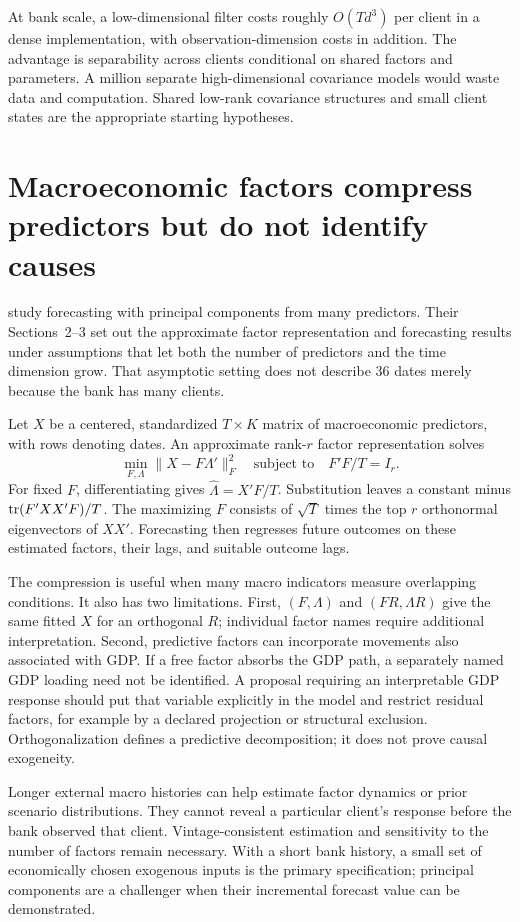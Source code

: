 At bank scale, a low-dimensional filter costs roughly $O(Td^3)$ per client in a dense implementation, with observation-dimension costs in addition. The advantage is separability across clients conditional on shared factors and parameters. A million separate high-dimensional covariance models would waste data and computation. Shared low-rank covariance structures and small client states are the appropriate starting hypotheses.

\section{Macroeconomic factors compress predictors but do not identify causes}
\citet{stock2002} study forecasting with principal components from many predictors. Their Sections~2--3 set out the approximate factor representation and forecasting results under assumptions that let both the number of predictors and the time dimension grow. That asymptotic setting does not describe 36 dates merely because the bank has many clients.

Let $X$ be a centered, standardized $T\times K$ matrix of macroeconomic predictors, with rows denoting dates. An approximate rank-$r$ factor representation solves
\begin{equation}
\min_{F,\Lambda}\|X-F\Lambda'\|_F^2
\quad\text{subject to}\quad F'F/T=I_r.
\end{equation}
For fixed $F$, differentiating gives $\widehat\Lambda=X'F/T$. Substitution leaves a constant minus $\operatorname{tr}(F'XX'F)/T$. The maximizing $F$ consists of $\sqrt T$ times the top $r$ orthonormal eigenvectors of $XX'$. Forecasting then regresses future outcomes on these estimated factors, their lags, and suitable outcome lags.

The compression is useful when many macro indicators measure overlapping conditions. It also has two limitations. First, $(F,\Lambda)$ and $(FR,\Lambda R)$ give the same fitted $X$ for an orthogonal $R$; individual factor names require additional interpretation. Second, predictive factors can incorporate movements also associated with GDP. If a free factor absorbs the GDP path, a separately named GDP loading need not be identified. A proposal requiring an interpretable GDP response should put that variable explicitly in the model and restrict residual factors, for example by a declared projection or structural exclusion. Orthogonalization defines a predictive decomposition; it does not prove causal exogeneity.

Longer external macro histories can help estimate factor dynamics or prior scenario distributions. They cannot reveal a particular client's response before the bank observed that client. Vintage-consistent estimation and sensitivity to the number of factors remain necessary. With a short bank history, a small set of economically chosen exogenous inputs is the primary specification; principal components are a challenger when their incremental forecast value can be demonstrated.

